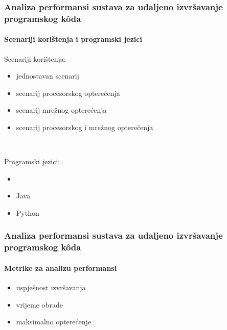 \documentclass{beamer}
\newif\ifplacelogo
\begin{document}
\begin{frame}
\frametitle{Analiza performansi sustava za udaljeno izvršavanje programskog kôda}
\framesubtitle{Scenariji korištenja i programski jezici}
Scenariji korištenja:
\begin{itemize}
	\item jednostavan scenarij
	\item scenarij procesorskog opterećenja
	\item scenarij mrežnog opterećenja
	\item scenarij procesorskog i mrežnog opterećenja
\end{itemize}

\

Programski jezici:
\begin{itemize}
	\item {}
	\item Java
	\item Python
\end{itemize}
\end{frame}

\begin{frame}
\frametitle{Analiza performansi sustava za udaljeno izvršavanje programskog kôda}
\framesubtitle{Metrike za analizu performansi}
\begin{itemize}
	\item uspješnost izvršavanja
	\item vrijeme obrade
	\item maksimalno opterećenje
\end{itemize}
\end{frame}

\placelogofalse
\end{document}
